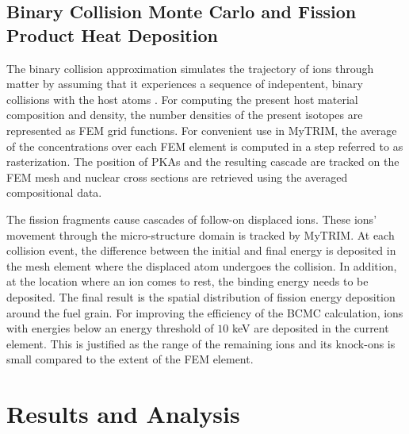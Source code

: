\documentclass{anstrans}
\begin{document}
\subsection{Binary Collision Monte Carlo and Fission Product Heat Deposition}
The binary collision approximation simulates the trajectory of ions through matter by assuming that it experiences a sequence of indepentent, binary collisions with the host atoms \cite{SRIM}. For computing the present host material composition and density, the number densities of the present isotopes are represented as FEM grid functions. For convenient use in MyTRIM, the average of the concentrations over each FEM element is computed in a step referred to as rasterization. The position of PKAs and the resulting cascade are tracked on the FEM mesh and nuclear cross sections are retrieved using the averaged compositional data.

The fission fragments cause cascades of follow-on displaced ions. These ions' movement through the micro-structure domain is tracked by MyTRIM. At each collision event, the difference between the initial and final energy is deposited in the mesh element where the displaced atom undergoes the collision. In addition, at the location where an ion comes to rest, the binding energy needs to be deposited. The final result is
the spatial distribution of fission energy deposition around the fuel grain.
For improving the efficiency of the BCMC calculation, ions with energies below an energy threshold of $10$ keV are deposited in the current element. This is justified as the range of the remaining ions and its knock-ons is small compared to the extent of the FEM element.

\section{Results and Analysis}

\end{document}
